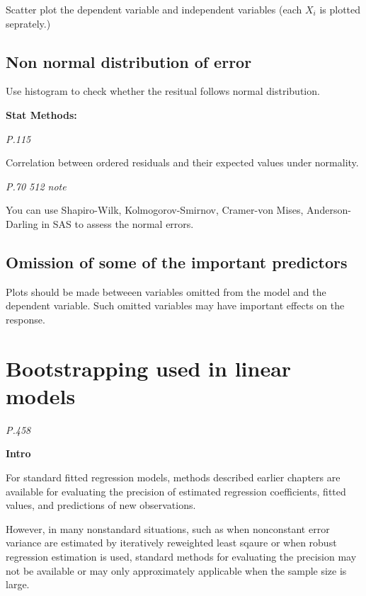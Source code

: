 \documentclass[]{book}
\begin{document}
Scatter plot the dependent variable and independent variables (each \(X_i\) is plotted seprately.)

\hypertarget{non-normal-distribution-of-error}{%
\subsection{Non normal distribution of error}\label{non-normal-distribution-of-error}}

Use histogram to check whether the resitual follows normal distribution.

\textbf{Stat Methods:}

\emph{P.115}

Correlation between ordered residuals and their expected values under normality.

\emph{P.70 512 note}

You can use Shapiro-Wilk, Kolmogorov-Smirnov, Cramer-von Mises, Anderson-Darling in SAS to assess the normal errors.

\hypertarget{omission-of-some-of-the-important-predictors}{%
\subsection{Omission of some of the important predictors}\label{omission-of-some-of-the-important-predictors}}

Plots should be made betweeen variables omitted from the model and the dependent variable. Such omitted variables may have important effects on the response.

\hypertarget{bootstrapping-used-in-linear-models}{%
\section{Bootstrapping used in linear models}\label{bootstrapping-used-in-linear-models}}

\emph{P.458}

\textbf{Intro}

For standard fitted regression models, methods described earlier chapters are available for evaluating the precision of estimated regression coefficients, fitted values, and predictions of new observations.

However, in many nonstandard situations, such as when nonconstant error variance are estimated by iteratively reweighted least sqaure or when robust regression estimation is used, standard methods for evaluating the precision may not be available or may only approximately applicable when the sample size is large.
\end{document}
